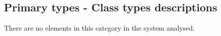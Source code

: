 \subsection{Primary types - Class types descriptions}


There are no elements in this category in the system analysed.


